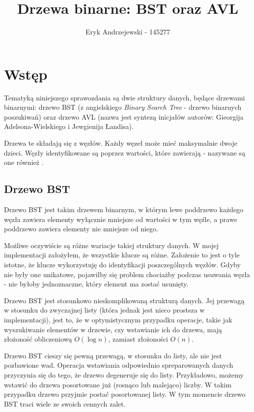 \documentclass[12pt]{article}
\title{Drzewa binarne: BST oraz AVL}
\author{Eryk Andrzejewski - 145277}
\begin{document}
    \maketitle
    \tableofcontents
    \newpage
    
    \section{Wstęp}
        Tematyką niniejszego sprawozdania są dwie struktury danych, będące drzewami binarnymi: drzewo BST (z angielskiego \textit{Binary Search Tree} - drzewo binarnych poszukiwań) oraz drzewo AVL (nazwa jest syntezą inicjałów autorów: Gieorgija Adelsona-Wielskiego i Jewgienija Łandisa).
        
        Drzewa te składają się z węzłów. Każdy węzeł może mieć maksymalnie dwoje dzieci. Węzły identyfikowane są poprzez wartości, które zawierają - nazywane są one również .
        
        \subsection{Drzewo BST}
            Drzewo BST jest takim drzewem binarnym, w którym lewe poddrzewo każdego węzła zawiera elementy wyłącznie mniejsze od wartości w tym węźle, a prawe poddrzewo zawiera elementy nie mniejsze od niego.
            
            Możliwe oczywiście są różne wariacje takiej struktury danych. W mojej implementacji założyłem, że wszystkie klucze są różne. Założenie to jest o tyle istotne, że klucze wykorzystuję do identyfikacji poszczególnych węzłów. Gdyby nie były one unikatowe, pojawiłby się problem chociażby podczas usuwania węzła - nie byłoby jednoznaczne, który element ma zostać usunięty.
            
            Drzewo BST jest stosunkowo nieskomplikowaną strukturą danych. Jej przewagą w stosunku do zwyczajnej listy (która jednak jest nieco prostsza w implementacji), jest to, że w optymistycznym przypadku operacje, takie jak wyszukiwanie elementów w drzewie, czy wstawianie ich do drzewa, mają złożoność obliczeniową $O(\log{n})$, zamiast złożoności $O(n)$.
            
            Drzewo BST cieszy się pewną przewagą, w stosunku do listy, ale nie jest pozbawione wad. Operacja wstawiania odpowiednio spreparowanych danych przyczynia się do tego, że drzewo degeneruje się do listy. Przykładowo, możemy wstawić do drzewa posortowane już (rosnąco lub malejąco) liczby. W takim przypadku drzewo przyjmie postać posortowanej listy. W tym momencie drzewo BST traci wiele ze swoich cennych zalet.
            
\end{document}
